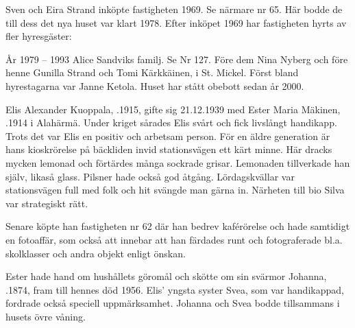 
Sven och Eira Strand inköpte fastigheten 1969. Se närmare nr 65. Här bodde de till dess det nya huset var klart 1978. Efter inköpet 1969 har fastigheten hyrts av fler hyresgäster:

År 1979 – 1993  Alice Sandviks familj. Se Nr 127. Före dem Nina Nyberg och före henne Gunilla Strand och Tomi Kärkkäinen,  i St. Mickel. Först bland hyrestagarna var Janne Ketola. Huset har stått obebott sedan år 2000.



Elis Alexander Kuoppala, .1915, gifte sig 21.12.1939 med Ester Maria Mäkinen, .1914 i Alahärmä. Under kriget sårades Elis svårt och fick livslångt handikapp. Trots det var Elis en positiv och arbetsam person. För en äldre generation är hans kioskrörelse på bäckliden invid stationsvägen ett kärt minne. Här dracks mycken lemonad och förtärdes många sockrade grisar. Lemonaden tillverkade han själv, likaså glass. Pilsner hade också god åtgång. Lördagskvällar var stationsvägen full med folk och hit svängde man gärna in. Närheten till bio Silva var strategiskt rätt.

Senare köpte han fastigheten nr 62 där han bedrev kaférörelse och hade samtidigt en fotoaffär, som också att innebar att han färdades runt och fotograferade bl.a. skolklasser och andra objekt enligt önskan.


Ester hade hand om hushållets göromål och skötte om sin svärmor Johanna, .1874, fram till hennes död 1956. Elis' yngsta syster Svea, som var handikappad, fordrade också speciell uppmärksamhet. Johanna och Svea bodde tillsammans i husets övre våning.
\begin{jhchildren}
  \item {}
  \item {}
\end{jhchildren}




